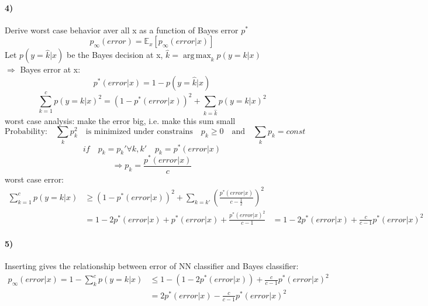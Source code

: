 \documentclass[11pt]{article}
\DeclareMathOperator*{\argmax}{arg\,max}
\begin{document}
        \paragraph{4)}
          Derive worst case behavior aver all x as a function of Bayes error
          $p^*$
          \begin{equation*}
            p_{\infty}(error) = \mathbb{E}_{x}[p_{\infty}(error|x)]
          \end{equation*}
          Let $p(y=\hat{k}|x)$ be the Bayes decision at x, $\hat{k} =
          \argmax_{k}p(y=k|x)$ \\
          $\Rightarrow$ Bayes error at x:
          \begin{equation*}
            p^*(error|x) = 1-p(y=\hat{k}|x)
          \end{equation*}
          \begin{equation*}
            \sum_{k=1}^{c} p(y=k|x)^2 = (1-p^*(error|x))^2 + \sum_{k=\hat{k}}
            p(y=k|x)^2
          \end{equation*}
          worst case analysis: make the error big, i.e. make this sum small
          \begin{equation*}
            \text{Probability:} \quad \sum_{k} p_{k}^2 \quad \text{is minimized
            under constrains} \quad p_{k} \geq 0 \quad \text{and}\quad \sum_{k}p_{k}=const
          \end{equation*}
          \begin{equation*}
            if \quad p_{k}=p_{k}' \forall k, k' \quad p_{k} = p^*(error|x)
          \end{equation*}
          \begin{equation*}
            \Rightarrow p_k = \frac{p^*(error|x)}{c}
          \end{equation*}
          worst case error:
          \begin{equation*}
            \begin{align*}
            \sum_{k=1}^{c} p(y=k|x) &\geq (1-p^*(error|x))^2 + \sum_{k=k'}
            (\frac{p^*(error|x)}{c- \frac{1}{2}})^2 \\
            &=1-2p^*(error|x)+p^*(error|x)+\frac{p^*(error|x)^2}{c-1}
            &=1-2p^*(error|x) + \frac{c}{c-1}p^*(error|x)^2
            \end{align*}
          \end{equation*}
        \paragraph{5)}
          Inserting gives the relationship between error of NN classifier and
          Bayes classifier:
          \begin{equation*}
            \begin{align*}
              p_{\infty}(error|x)=1-\sum_{k}^{c}p(y=k|x) &\leq 1-(1-2p^*(error
              |x))+\frac{c}{c-1}p^*(error|x)^2 \\
              &=2p^*(error|x)-\frac{c}{c-1}p^*(error|x)^2
            \end{align*}
          \end{equation*}
\end{document}
